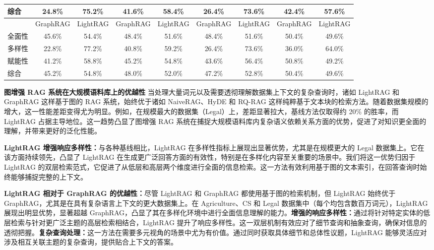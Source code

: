 \documentclass[11pt,UTF8,fontset=fandol]{ctexart}
\begin{document}
\begin{table}[H]
\begin{tabular}{lcccccccc}
综合 & 24.8\% & 75.2\% & 41.6\% & 58.4\% & 26.4\% & 73.6\% & 42.4\% & 57.6\% \\
\midrule
& GraphRAG & LightRAG & GraphRAG & LightRAG & GraphRAG & LightRAG & GraphRAG & LightRAG \\
\midrule
全面性 & 45.6\% & 54.4\% & 48.4\% & 51.6\% & 48.4\% & 51.6\% & 50.4\% & 49.6\% \\
多样性 & 22.8\% & 77.2\% & 40.8\% & 59.2\% & 26.4\% & 73.6\% & 36.0\% & 64.0\% \\
赋能性 & 41.2\% & 58.8\% & 45.2\% & 54.8\% & 43.6\% & 56.4\% & 50.8\% & 49.2\% \\
综合 & 45.2\% & 54.8\% & 48.0\% & 52.0\% & 47.2\% & 52.8\% & 50.4\% & 49.6\% \\
\bottomrule
\end{tabular}
\end{table}

\textbf{图增强 RAG 系统在大规模语料库上的优越性} 当处理大量词元以及需要透彻理解数据集上下文的复杂查询时，诸如 LightRAG 和 GraphRAG 这样基于图的 RAG 系统，始终优于诸如 NaiveRAG、HyDE 和 RQ-RAG 这样纯粹基于文本块的检索方法。随着数据集规模的增大，这一性能差距变得尤为明显。例如，在规模最大的数据集（Legal）上，差距显著拉大，基线方法仅取得约 20\% 的胜率，而 LightRAG 占据主导地位。这一趋势凸显了图增强 RAG 系统在捕捉大规模语料库内复杂语义依赖关系方面的优势，促进了对知识更全面的理解，并带来更好的泛化性能。

\textbf{LightRAG 增强响应多样性：}与各种基线相比，LightRAG 在多样性指标上展现出显著优势，尤其是在规模更大的 Legal 数据集上。它在该方面持续领先，凸显了 LightRAG 在生成更广泛回答方面的有效性，特别是在多样化内容至关重要的场景中。我们将这一优势归因于 LightRAG 的双层检索范式，它促进了从低层和高层两个维度进行全面的信息检索。这一方法有效利用基于图的文本索引，在回答查询时始终能够捕捉完整的上下文。

\textbf{LightRAG 相对于 GraphRAG 的优越性：}尽管 LightRAG 和 GraphRAG 都使用基于图的检索机制，但 LightRAG 始终优于 GraphRAG，尤其是在具有复杂语言上下文的更大数据集上。在 Agriculture、CS 和 Legal 数据集中（每个均包含数百万词元），LightRAG 展现出明显优势，显著超越 GraphRAG，凸显了其在多样化环境中进行全面信息理解的能力。\textbf{增强的响应多样性：}通过将针对特定实体的低层检索与针对更广泛主题的高层检索相结合，LightRAG 提升了响应多样性。这一双层机制有效应对了细节查询和抽象查询，确保对信息的透彻把握。\textbf{复杂查询处理：}这一方法在需要多元视角的场景中尤为有价值。通过同时获取具体细节和总体性议题，LightRAG 能够灵活应对涉及相互关联主题的复杂查询，提供贴合上下文的答案。
\end{document}

